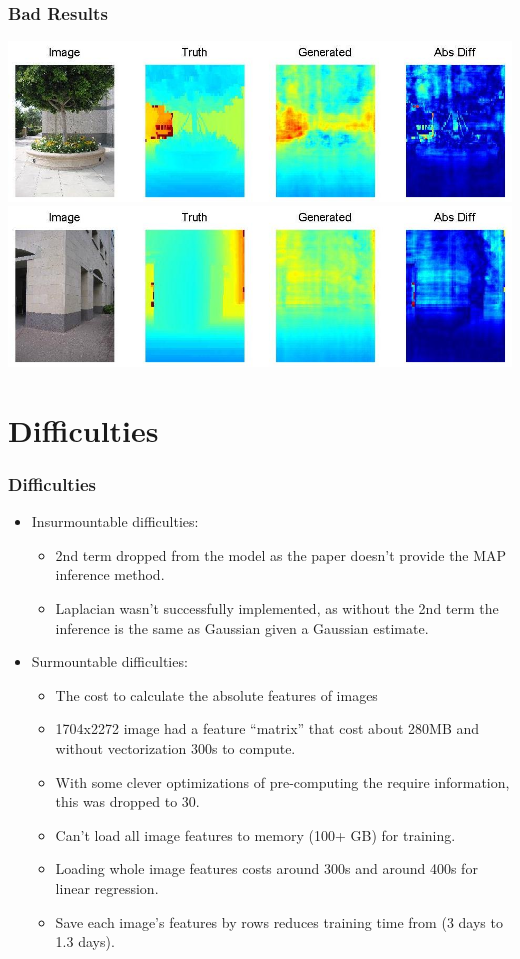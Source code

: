 \documentclass[handout]{beamer}
\newcommand{\vitem}{\vfill\item}
\begin{document}
\begin{frame}[t]\frametitle{Bad Results}
    \includegraphics[width=\linewidth]{bad3.jpg} \\
    \vfill\includegraphics[width=\linewidth]{bad4.jpg}
\end{frame}

\section{Difficulties}
\begin{frame}[t]\frametitle{Difficulties}
    \begin{itemize}
        \item Insurmountable difficulties:
        \begin{itemize}
            \vitem 2nd term dropped from the model as the paper doesn't provide the MAP inference method.
            \vitem Laplacian wasn't successfully implemented, as without the 2nd term the inference is the same as Gaussian given a Gaussian estimate.
        \end{itemize}
        \item Surmountable difficulties:
        \begin{itemize}
            \vitem The cost to calculate the absolute features of images
            \vitem 1704x2272 image had a feature ``matrix'' that cost about 280MB and without vectorization 300s to compute.
            \vitem With some clever optimizations of pre-computing the require information, this was dropped to 30.
            \vitem Can't load all image features to memory (100+ GB) for training.
            \vitem Loading whole image features costs around 300s and around 400s for linear regression.
            \vitem Save each image's features by rows reduces training time from (3 days to 1.3 days).
        \end{itemize}
    \end{itemize}
\end{frame}
\end{document}
